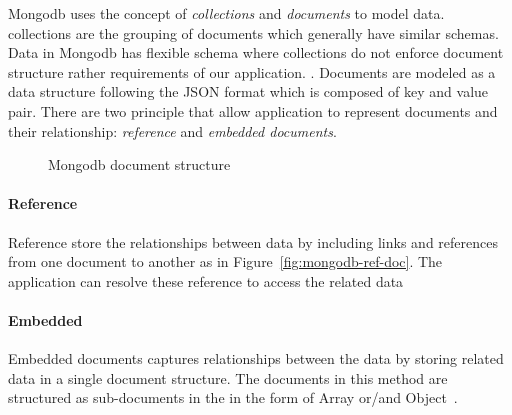 
Mongodb uses the concept of \textit{collections} and \textit{documents} to model data. collections are the grouping of documents which generally have similar schemas. Data in Mongodb has flexible schema where collections do not enforce document structure rather requirements of our application. .  Documents are modeled as a data structure following the JSON format which is composed of key and value pair. There are two principle that allow application to represent documents and their relationship: \textit{reference} and \textit{embedded documents}. 
\begin{figure}
	\centering
	\centering
	\caption{Mongodb document structure}
	\label{fig:mongodb-doc}
	 
\end{figure}

\paragraph{Reference}
		Reference store the relationships between data by including links and references from one document to another as in  Figure~\ref{fig:mongodb-ref-doc}. The application can resolve these reference to access the related data
\paragraph{Embedded}
	Embedded documents captures relationships between the data by storing related data in a single document structure. The documents in this method are structured as sub-documents in the in the form of Array or/and Object~\cite{nosql/comparision}. 
	
